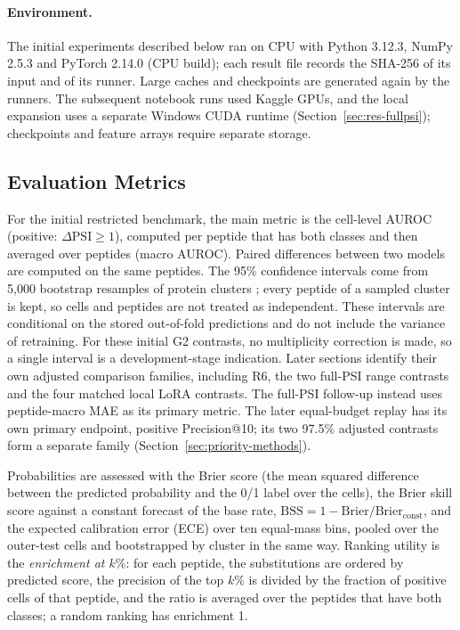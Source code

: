 \paragraph{Environment.}
The initial experiments described below ran on CPU with Python 3.12.3, NumPy 2.5.3 and PyTorch 2.14.0 (CPU build); each result file
records the SHA-256 of its input and of its runner. Large caches and checkpoints are generated again by the
runners. The subsequent notebook runs used Kaggle GPUs, and the local expansion uses a separate
Windows CUDA runtime (Section~\ref{sec:res-fullpsi}); checkpoints and feature arrays require separate storage.

\subsection{Evaluation Metrics}
For the initial restricted benchmark, the main metric is the cell-level AUROC (positive: $\Delta\mathrm{PSI}\ge1$), computed per peptide that has both
classes and then averaged over peptides (macro AUROC). Paired differences between two models are computed on
the same peptides. The 95\% confidence intervals come from 5,000 bootstrap resamples of protein clusters
\citep{efron1979}; every peptide of a sampled cluster is kept, so cells and peptides are not treated as
independent. These intervals are conditional on the stored out-of-fold predictions and do not include the
variance of retraining. For these initial G2 contrasts, no multiplicity correction is made, so a single
interval is a development-stage indication. Later sections identify their own adjusted comparison
families, including R6, the two full-PSI range contrasts and the four matched local LoRA contrasts.
The full-PSI follow-up instead uses peptide-macro MAE as its primary metric.
The later equal-budget replay has its own primary endpoint, positive Precision@10; its two
97.5\% adjusted contrasts form a separate family (Section~\ref{sec:priority-methods}).

Probabilities are assessed with the Brier score (the mean squared difference between the predicted
probability and the 0/1 label over the cells), the Brier skill score against a constant forecast of the base rate,
$\mathrm{BSS}=1-\mathrm{Brier}/\mathrm{Brier}_{\mathrm{const}}$, and the expected calibration error (ECE) over ten
equal-mass bins, pooled over the outer-test cells and bootstrapped by cluster in the same way. Ranking utility is the
\emph{enrichment at $k\%$}: for each peptide, the substitutions are ordered by predicted score, the precision of the
top $k\%$ is divided by the fraction of positive cells of that peptide, and the ratio is averaged over the peptides
that have both classes; a random ranking has enrichment 1.

